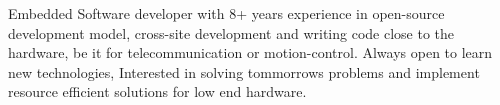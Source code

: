 

\begin{cvparagraph}

Embedded Software developer with 8+ years experience in open-source development model, cross-site development and writing code close to the hardware, be it for telecommunication or motion-control. Always open to learn new technologies, Interested in solving tommorrows problems and implement resource efficient solutions for low end hardware.
\end{cvparagraph}
